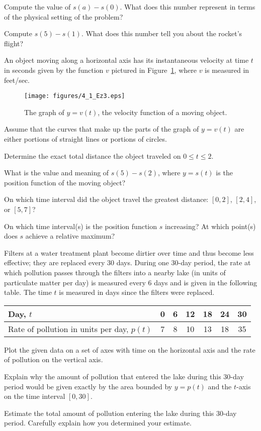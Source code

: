 \begin{exercises}
	\item Compute the value of $s(a) - s(0)$.  What does this number represent in terms of the physical setting of the problem?
	\item Compute $s(5) - s(1)$.  What does this number tell you about the rocket's flight?
  \ea
  \item An object moving along a horizontal axis has its instantaneous velocity at time $t$ in seconds given by the function $v$ pictured in Figure~\ref{F:4.1.Ez3}, where $v$ is measured in feet/sec.
  \begin{figure}[h]
\begin{center}
\texttt{[image: figures/4\_1\_Ez3.eps]}
\caption{The graph of $y = v(t)$, the velocity function of a moving object.} \label{F:4.1.Ez3}
\end{center}
\end{figure}
Assume that the curves that make up the parts of the graph of $y=v(t)$ are either portions of straight lines or portions of circles.
 \ba
 	\item Determine the exact total distance the object traveled on $0 \le t \le 2$.
	\item What is the value and meaning of $s(5) - s(2)$, where $y = s(t)$ is the position function of the moving object?
	\item On which time interval did the object travel the greatest distance: $[0,2]$, $[2,4]$, or $[5,7]$?
	\item On which time interval(s) is the position function $s$ increasing?  At which point(s) does $s$ achieve a relative maximum?
 \ea
  \item Filters at a water treatment plant become dirtier over time and thus become less effective; they are replaced every 30 days.  During one 30-day period, the rate at which pollution passes through the filters into a nearby lake (in units of particulate matter per day) is measured every 6 days and is given in the following table.  The time $t$  is measured in days since the filters were replaced.
\begin{center}
\begin{tabular}{|l|c|c|c|c|c|c|}
\hline
Day, $t$ & 0 & 6 & 12 &	18 & 24 & 30 \\
\hline
Rate of pollution in units per day, $p(t)$ & 7 & 8 & 10 &	13 & 18 & 35 \\
\hline
\end{tabular}
\end{center}
\ba
	\item Plot the given data on a set of axes with time on the horizontal axis and the rate of pollution on the vertical axis.
	\item Explain why the amount of pollution that entered the lake during this 30-day period would be given exactly by the area bounded by $y = p(t)$ and the $t$-axis on the time interval $[0,30]$.
	\item Estimate the total amount of pollution entering the lake during this 30-day period.  Carefully explain how you determined your estimate.
\ea
\end{exercises}
\afterexercises
